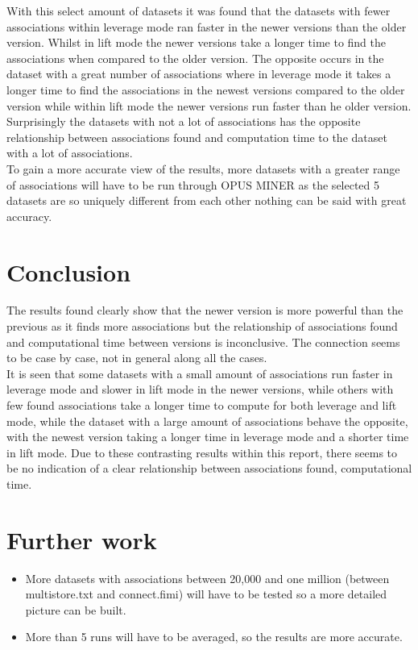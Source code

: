 \documentclass[10pt,a4paper]{article}
\begin{document}
With this select amount of datasets it was found that the datasets with fewer associations within leverage mode ran faster in the newer versions than the older version. Whilst in lift mode the newer versions take a longer time to find the associations when compared to the older version. The opposite occurs in the dataset with a great number of associations where in leverage mode it takes a longer time to find the associations in the newest versions compared to the older version while within lift mode the newer versions run faster than he older version. Surprisingly the datasets with not a lot of associations has the opposite relationship between associations found and computation time to the dataset with a lot of associations.\\
To gain a more accurate view of the results, more datasets with a greater range of associations will have to be run through OPUS MINER as the selected 5 datasets are so uniquely different from each other nothing can be said with great accuracy.



\section{Conclusion}
The results found clearly show that the newer version is more powerful than the previous as it finds more associations but the relationship of associations found and computational time between versions is inconclusive. The connection seems to be case by case, not in general along all the cases.\\
It is seen that some datasets with a small amount of associations run faster in leverage mode and slower in lift mode in the newer versions, while others with few found associations take a longer time to compute for both leverage and lift mode, while the dataset with a large amount of associations behave the opposite, with the newest version taking a longer time in leverage mode and a shorter time in lift mode. Due to these contrasting results within this report, there seems to be no indication of a clear relationship between associations found, computational time.\\


\section{Further work}
\begin{itemize}
	\item More datasets with associations between 20,000 and one million (between multistore.txt and connect.fimi) will have to be tested so a more detailed picture can be built.
	
	\item More than 5 runs will have to be averaged, so the results are more accurate.
	
\end{itemize}
\end{document}
